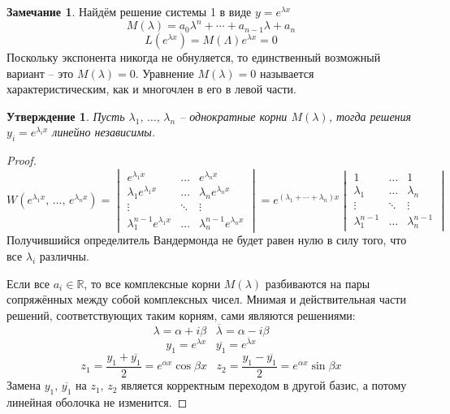 \documentclass[a4paper,12pt]{article}
\theoremstyle{plain}
\newtheorem{proposition}{Утверждение}[section]
\theoremstyle{definition}
\newtheorem*{note}{Замечание}
\theoremstyle{remark}
\begin{document}
\begin{note}
	Найдём решение системы 1 в виде $y = e^{\lambda x}$
	\[M(\lambda) = a_0\lambda^n + \cdots + a_{n-1}\lambda + a_n\]
	\[L(e^{\lambda x}) = M(\Lambda)e^{\lambda x} = 0\]
	Поскольку экспонента никогда не обнуляется, то единственный возможный вариант -- это $M(\lambda) = 0$. Уравнение $M(\lambda) = 0$ называется характеристическим, как и многочлен в его в левой части.
\end{note}

\begin{proposition}
	Пусть $\lambda_1,\,\ldots,\,\lambda_n$ -- однократные корни $M(\lambda)$, тогда решения $y_i = e^{\lambda_i x}$ линейно независимы.
\end{proposition}

\begin{proof}
	\[W(e^{\lambda_1 x},\,\ldots,\,e^{\lambda_n x}) = \begin{vmatrix}
			e^{\lambda_1 x}                & \ldots & e^{\lambda_n x}                \\
			\lambda_1e^{\lambda_1 x}       & \ldots & \lambda_ne^{\lambda_n x}       \\
			\vdots                         & \ddots & \vdots                         \\
			\lambda_1^{n-1}e^{\lambda_1 x} & \ldots & \lambda_n^{n-1}e^{\lambda_n x}
		\end{vmatrix} = e^{(\lambda_1 + \cdots + \lambda_n)x}\begin{vmatrix}
			1               & \ldots & 1               \\
			\lambda_1       & \ldots & \lambda_n       \\
			\vdots          & \ddots & \vdots          \\
			\lambda_1^{n-1} & \ldots & \lambda_n^{n-1}
		\end{vmatrix}\]
	Получившийся определитель Вандермонда не будет равен нулю в силу того, что все $\lambda_i$ различны.

	Если все $a_i \in \mathbb{R}$, то все комплексные корни $M(\lambda)$ разбиваются на пары сопряжённых между собой комплексных чисел. Мнимая и действительная части решений, соответствующих таким корням, сами являются решениями:
	\[\lambda = \alpha + i\beta\;\;\; \overline{\lambda} = \alpha - i\beta\]
	\[y_1 = e^{\lambda x}\;\;\; \overline{y_1} = e^{\overline{\lambda}x}\]
	\[z_1 = \frac{y_1 + \overline{y_1}}{2} = e^{\alpha x}\cos \beta x\;\;\; z_2 = \frac{y_1 - \overline{y_1}}{2} = e^{\alpha x}\sin \beta x\]
	Замена $y_1,\,\overline{y_1}$ на $z_1,\,z_2$ является корректным переходом в другой базис, а потому линейная оболочка не изменится.
\end{proof}
\end{document}

